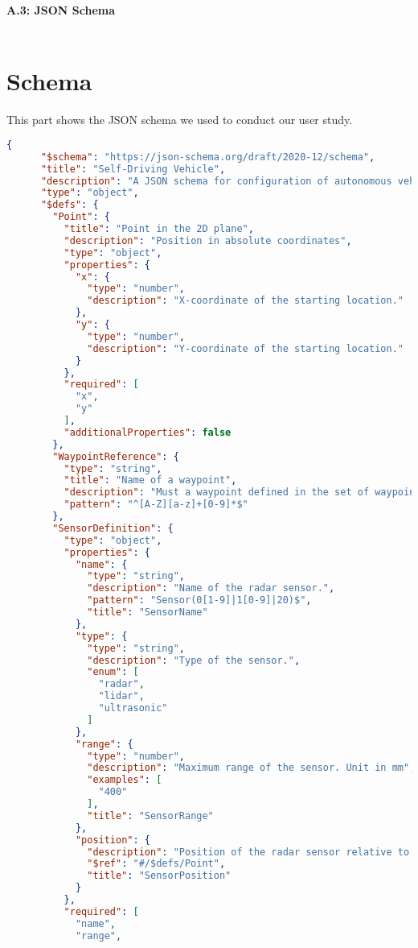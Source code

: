\newpage
{\large \textbf{A.3: JSON Schema }} \\\\
\section{Schema} \label{appendix:json_schema}
This part shows the JSON schema we used to conduct our user study.
\begin{lstlisting}[language=json,firstnumber=1]
    {
      "$schema": "https://json-schema.org/draft/2020-12/schema",
      "title": "Self-Driving Vehicle",
      "description": "A JSON schema for configuration of autonomous vehicles",
      "type": "object",
      "$defs": {
        "Point": {
          "title": "Point in the 2D plane",
          "description": "Position in absolute coordinates",
          "type": "object",
          "properties": {
            "x": {
              "type": "number",
              "description": "X-coordinate of the starting location."
            },
            "y": {
              "type": "number",
              "description": "Y-coordinate of the starting location."
            }
          },
          "required": [
            "x",
            "y"
          ],
          "additionalProperties": false
        },
        "WaypointReference": {
          "type": "string",
          "title": "Name of a waypoint",
          "description": "Must a waypoint defined in the set of waypoints.",
          "pattern": "^[A-Z][a-z]+[0-9]*$"
        },
        "SensorDefinition": {
          "type": "object",
          "properties": {
            "name": {
              "type": "string",
              "description": "Name of the radar sensor.",
              "pattern": "Sensor(0[1-9]|1[0-9]|20)$",
              "title": "SensorName"
            },
            "type": {
              "type": "string",
              "description": "Type of the sensor.",
              "enum": [
                "radar",
                "lidar",
                "ultrasonic"
              ]
            },
            "range": {
              "type": "number",
              "description": "Maximum range of the sensor. Unit in mm",
              "examples": [
                "400"
              ],
              "title": "SensorRange"
            },
            "position": {
              "description": "Position of the radar sensor relative to the vehicle's center.",
              "$ref": "#/$defs/Point",
              "title": "SensorPosition"
            }
          },
          "required": [
            "name",
            "range",

\end{lstlisting}
